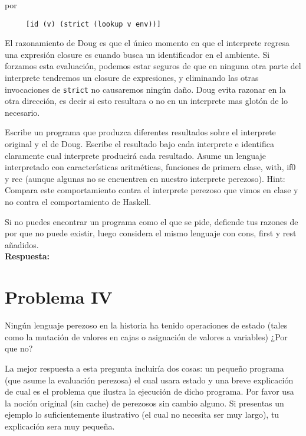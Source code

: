 \documentclass[12pt]{article}
\begin{document}
por

\begin{verbatim}
     [id (v) (strict (lookup v env))]
\end{verbatim}

El razonamiento de Doug es que el único momento en que el interprete regresa una
expresión closure es cuando busca un identificador en el ambiente. Si forzamos
esta evaluación, podemos estar seguros de que en ninguna otra parte del interprete
tendremos un closure de expresiones, y eliminando las otras invocaciones de
\texttt{strict} no causaremos ningún daño. Doug evita razonar en la otra dirección,
es decir si esto resultara o no en un interprete mas glotón de lo necesario.

Escribe un programa que produzca diferentes resultados sobre el interprete original
y el de Doug. Escribe el resultado bajo cada interprete e identifica claramente
cual interprete producirá cada resultado. Asume un lenguaje interpretado
con características aritméticas, funciones de primera clase, with, if0 y rec
(aunque algunas no se encuentren en nuestro interprete perezoso). Hint: Compara
este comportamiento contra el interprete perezoso que vimos en clase y no contra
el comportamiento de Haskell.

Si no puedes encontrar un programa como el que se pide, defiende tus razones
de por que no puede existir, luego considera el mismo lenguaje con cons, first
y rest añadidos.
\\

\textbf{Respuesta: }



\section*{Problema IV}
Ningún lenguaje perezoso en la historia ha tenido operaciones de estado (tales
como la mutación de valores en cajas o asignación de valores a variables) ¿Por
que no?

La mejor respuesta a esta pregunta incluiría dos cosas: un pequeño programa (que
asume la evaluación perezosa) el cual usara estado y una breve explicación de cual
es el problema que ilustra la ejecución de dicho programa. Por favor usa la
noción original (sin cache) de perezosos sin cambio alguno. Si presentas un
ejemplo lo suficientemente ilustrativo (el cual no necesita ser muy largo), tu
explicación sera muy pequeña.
\end{document}
